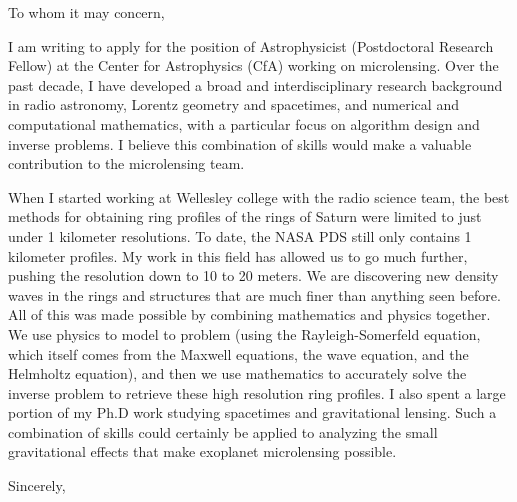 \documentclass{letter}
\begin{document}
    \begin{letter}{}
        \opening{To whom it may concern,}
            I am writing to apply for the position of Astrophysicist
            (Postdoctoral Research Fellow) at the Center for Astrophysics
            (CfA) working on microlensing.
            Over the past decade, I have developed a broad and
            interdisciplinary research background in radio astronomy, Lorentz
            geometry and spacetimes, and numerical and computational
            mathematics, with a particular focus on algorithm design and
            inverse problems. I believe this combination of skills would
            make a valuable contribution to the microlensing team.
            \par
            When I started working at Wellesley college with the radio science
            team, the best methods for obtaining ring profiles of the rings of
            Saturn were limited to just under 1 kilometer resolutions.
            To date, the NASA PDS still only contains 1 kilometer profiles.
            My work in this
            field has allowed us to go much further, pushing the resolution
            down to 10 to 20 meters. We are discovering new density waves in
            the rings and structures that are much finer than anything seen before.
            All of this was made possible by combining mathematics and physics
            together. We use physics to model to problem
            (using the Rayleigh-Somerfeld equation,
            which itself comes from the Maxwell equations, the wave equation, and
            the Helmholtz equation), and then we use mathematics to accurately
            solve the inverse problem to retrieve these high resolution ring
            profiles. I also spent a large portion of my Ph.D work studying
            spacetimes and gravitational lensing. Such a combination of skills
            could certainly be applied to analyzing the
            small gravitational effects that make exoplanet microlensing possible.
        \closing{Sincerely,}
    \end{letter}
\end{document}
